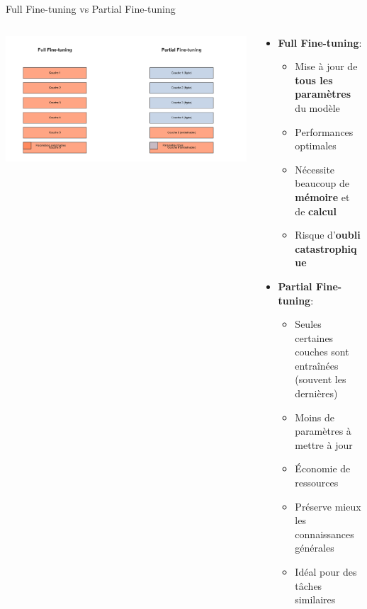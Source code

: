 \documentclass[aspectratio=169]{beamer}
\begin{document}
\begin{frame}{Full Fine-tuning vs Partial Fine-tuning}
    \begin{columns}
        \begin{column}{0.65\textwidth}
            \begin{center}
                \includegraphics[width=\textwidth]{images/generated/full_vs_partial_finetuning.png}
            \end{center}
        \end{column}
        \begin{column}{0.35\textwidth}
            \begin{itemize}
                \item \textbf{Full Fine-tuning}:
                \begin{itemize}
                    \item Mise à jour de \textbf{tous les paramètres} du modèle
                    \item Performances optimales
                    \item Nécessite beaucoup de \textbf{mémoire} et de \textbf{calcul}
                    \item Risque d'\textbf{oubli catastrophique}
                \end{itemize}
                \vspace{0.3cm}
                \item \textbf{Partial Fine-tuning}:
                \begin{itemize}
                    \item Seules certaines couches sont entraînées (souvent les dernières)
                    \item Moins de paramètres à mettre à jour
                    \item Économie de ressources
                    \item Préserve mieux les connaissances générales
                    \item Idéal pour des tâches similaires
                \end{itemize}
            \end{itemize}
        \end{column}
    \end{columns}
\end{frame}
\end{document}
